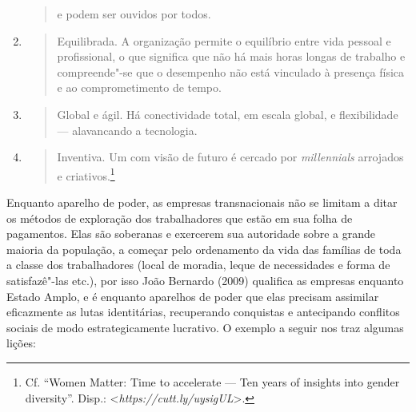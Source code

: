 \begin{enumerate}
\begin{quote}
  e podem ser ouvidos por todos.
  \end{quote}
\item
  \begin{quote}
  Equilibrada. A organização permite o equilíbrio entre vida pessoal e
  profissional, o que significa que não há mais horas longas de trabalho
  e compreende"-se que o desempenho não está vinculado à presença física
  e ao comprometimento de tempo.
  \end{quote}
\item
  \begin{quote}
  Global e ágil. Há conectividade total, em escala global, e
  flexibilidade --- alavancando a tecnologia.
  \end{quote}
\item
  \begin{quote}
  Inventiva. Um  com visão de futuro é cercado por \emph{millennials}
  arrojados e criativos.\footnote{Cf. ``Women Matter: Time to accelerate
    --- Ten years of insights into gender diversity''. Disp.:
    \textless{}\emph{https://cutt.ly/uysigUL}\textgreater{}.}
  \end{quote}
\end{enumerate}

Enquanto aparelho de poder, as empresas transnacionais não se limitam a
ditar os métodos de exploração dos trabalhadores que estão em sua folha
de pagamentos. Elas são soberanas e exercerem sua autoridade sobre a
grande maioria da população, a começar pelo ordenamento da vida das
famílias de toda a classe dos trabalhadores (local de moradia, leque de
necessidades e forma de satisfazê"-las etc.), por isso João Bernardo
(2009) qualifica as empresas enquanto Estado Amplo, e é enquanto
aparelhos de poder que elas precisam assimilar eficazmente as lutas
identitárias, recuperando conquistas e antecipando conflitos sociais de
modo estrategicamente lucrativo. O exemplo a seguir nos traz algumas
lições:

